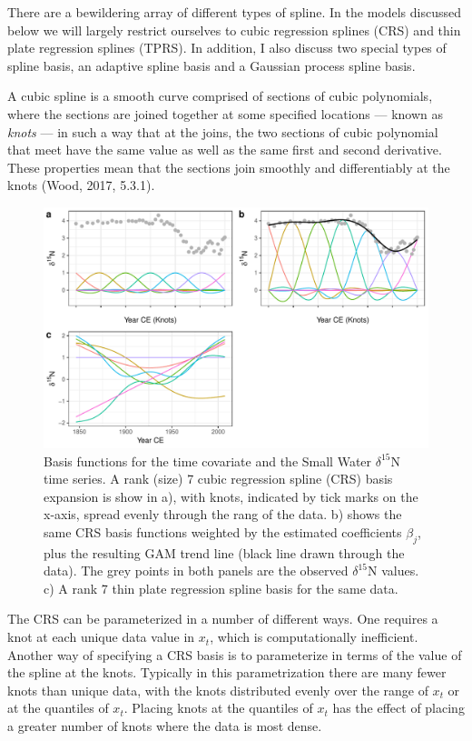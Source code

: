 \documentclass[12pt,]{article}
\begin{document}
There are a bewildering array of different types of spline. In the
models discussed below we will largely restrict ourselves to cubic
regression splines (CRS) and thin plate regression splines (TPRS). In
addition, I also discuss two special types of spline basis, an adaptive
spline basis and a Gaussian process spline basis.

A cubic spline is a smooth curve comprised of sections of cubic
polynomials, where the sections are joined together at some specified
locations --- known as \emph{knots} --- in such a way that at the joins,
the two sections of cubic polynomial that meet have the same value as
well as the same first and second derivative. These properties mean that
the sections join smoothly and differentiably at the knots (Wood, 2017,
5.3.1).

\begin{figure}

{\centering \includegraphics[width=0.8\linewidth]{manuscript_files/figure-latex/basis-function-example-plot-1} 

}

\caption{Basis functions for the time covariate and the Small Water $\delta^{15}\text{N}$ time series. A rank (size) 7 cubic regression spline (CRS) basis expansion is show in a), with knots, indicated by tick marks on the x-axis, spread evenly through the rang of the data. b) shows the same CRS basis functions weighted by the estimated coefficients $\beta_j$, plus the resulting GAM trend line (black line drawn through the data). The grey points in both panels are the observed $\delta^{15}\text{N}$ values. c) A rank 7 thin plate regression spline basis for the same data.}\label{fig:basis-function-example-plot}
\end{figure}

The CRS can be parameterized in a number of different ways. One requires
a knot at each unique data value in \(x_t\), which is computationally
inefficient. Another way of specifying a CRS basis is to parameterize in
terms of the value of the spline at the knots. Typically in this
parametrization there are many fewer knots than unique data, with the
knots distributed evenly over the range of \(x_t\) or at the quantiles
of \(x_t\). Placing knots at the quantiles of \(x_t\) has the effect of
placing a greater number of knots where the data is most dense.
\end{document}
